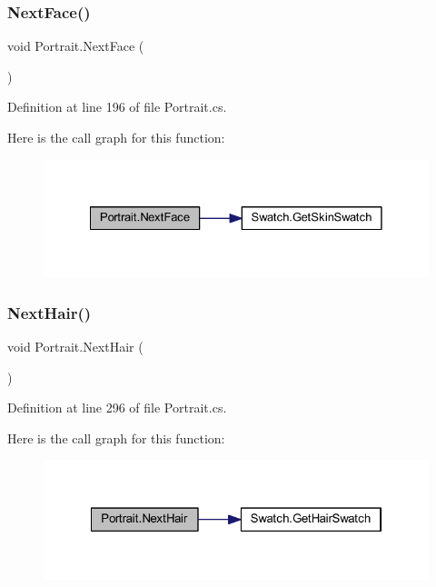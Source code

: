 \subsubsection{\texorpdfstring{NextFace()}{NextFace()}}
{\footnotesize\ttfamily void Portrait.\+Next\+Face (\begin{DoxyParamCaption}{ }\end{DoxyParamCaption})}



Definition at line 196 of file Portrait.\+cs.

Here is the call graph for this function\+:
\nopagebreak
\begin{figure}[H]
\begin{center}
\leavevmode
\includegraphics[width=328pt]{class_portrait_aaa0da57aae916077e97d6c9d0a48aa4d_cgraph}
\end{center}
\end{figure}
\mbox{\label{class_portrait_ae14081edd428a837484936bc56350a12}} 
\subsubsection{\texorpdfstring{NextHair()}{NextHair()}}
{\footnotesize\ttfamily void Portrait.\+Next\+Hair (\begin{DoxyParamCaption}{ }\end{DoxyParamCaption})}



Definition at line 296 of file Portrait.\+cs.

Here is the call graph for this function\+:
\nopagebreak
\begin{figure}[H]
\begin{center}
\leavevmode
\includegraphics[width=322pt]{class_portrait_ae14081edd428a837484936bc56350a12_cgraph}
\end{center}
\end{figure}
\mbox{\label{class_portrait_a8117eeefced674e0a4a483745ea0053d}} 

